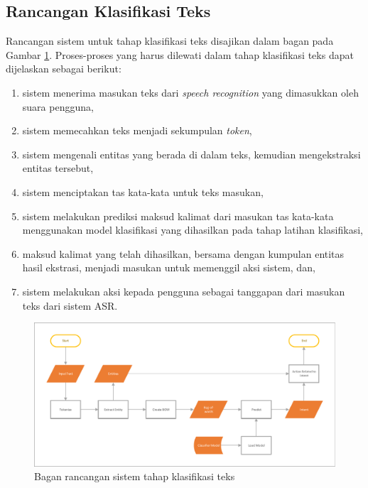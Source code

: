 \subsection{Rancangan Klasifikasi Teks}

Rancangan sistem untuk tahap klasifikasi teks disajikan dalam bagan pada Gambar \ref{fig:design_classification}. Proses-proses yang harus dilewati dalam tahap klasifikasi teks dapat dijelaskan sebagai berikut:

\begin{enumerate}
	\item sistem menerima masukan teks dari \textit{speech recognition} yang dimasukkan oleh suara pengguna,
	\item sistem memecahkan teks menjadi sekumpulan \textit{token},
	\item sistem mengenali entitas yang berada di dalam teks, kemudian mengekstraksi entitas tersebut,
	\item sistem menciptakan tas kata-kata untuk teks masukan,
	\item sistem melakukan prediksi maksud kalimat dari masukan tas kata-kata menggunakan model klasifikasi yang dihasilkan pada tahap latihan klasifikasi,
	\item maksud kalimat yang telah dihasilkan, bersama dengan kumpulan entitas hasil ekstrasi, menjadi masukan untuk memenggil aksi sistem, dan,
	\item sistem melakukan aksi kepada pengguna sebagai tanggapan dari masukan teks dari sistem ASR.
\end{enumerate}

\begin{figure}[H]
	\centering
	\includegraphics[width=\textwidth, trim=2 2 2 2, clip]{resources/4-design_classification.pdf}
	\caption{Bagan rancangan sistem tahap klasifikasi teks}
	\label{fig:design_classification}
\end{figure}

